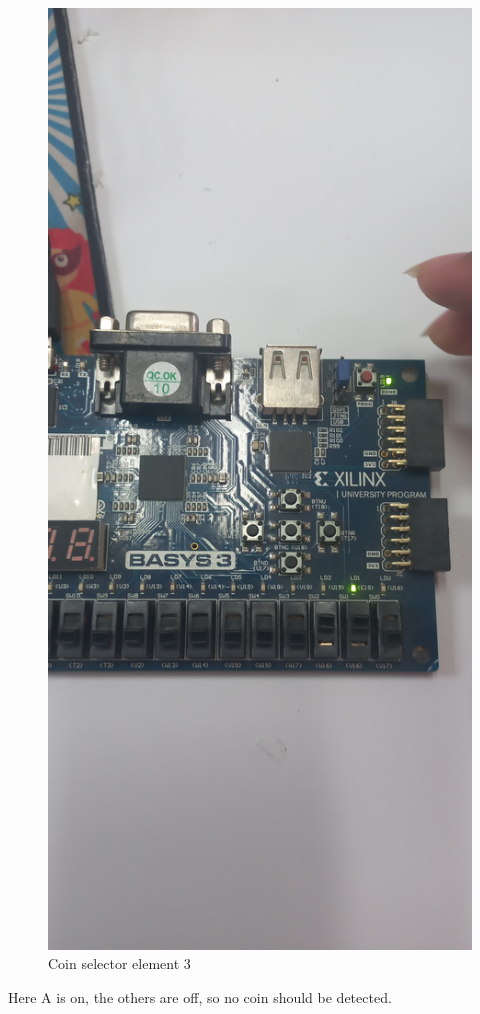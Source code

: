 \documentclass{article}
\begin{document}
\begin{multicols}{2}
	\begin{figure}[H]
		\centering
		\includegraphics[width=0.8\linewidth]{images/diagrams/coin-selector/coin-selector3.jpg}
		\caption{Coin selector element 3}
		\label{Coin selector element 3}
	\end{figure}

	Here A is on, the others are off, so no coin should be detected.


\end{multicols}
\end{document}
